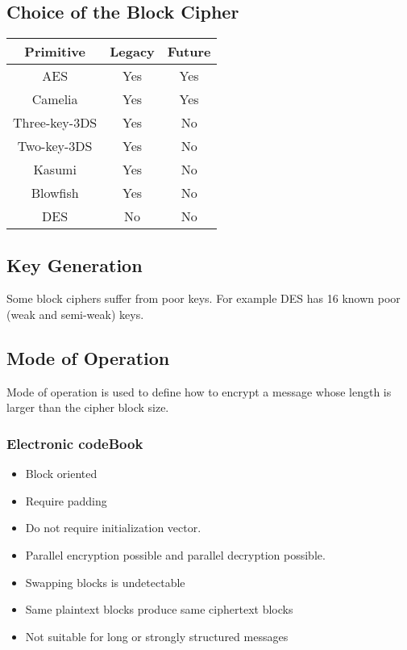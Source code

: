 
\subsection{Choice of the Block Cipher}
\begin{table}
    \centering
    \begin{tabular}{c|c|c}
        Primitive & Legacy & Future \\
        \hline
        AES & Yes & Yes \\
        Camelia & Yes & Yes \\
        \hline
        Three-key-3DS & Yes & No \\
        Two-key-3DS & Yes & No \\
        Kasumi & Yes & No \\
        Blowfish & Yes & No \\
        \hline
        DES & No & No\\
    \end{tabular}
\end{table}

\subsection{Key Generation}
Some block ciphers suffer from poor keys. For example DES has 16 known poor
(weak and semi-weak) keys. %

\subsection{Mode of Operation} %
Mode of operation is used to define how to encrypt a message whose length
is larger than the cipher block size.
\subsubsection{Electronic codeBook}

\begin{itemize}
    \item Block oriented
    \item Require padding
    \item Do not require initialization vector.
    \item Parallel encryption possible and parallel decryption possible.
    \item Swapping blocks is undetectable
    \item Same plaintext blocks produce same ciphertext blocks
    \item Not suitable for long or strongly structured messages
\end{itemize}

